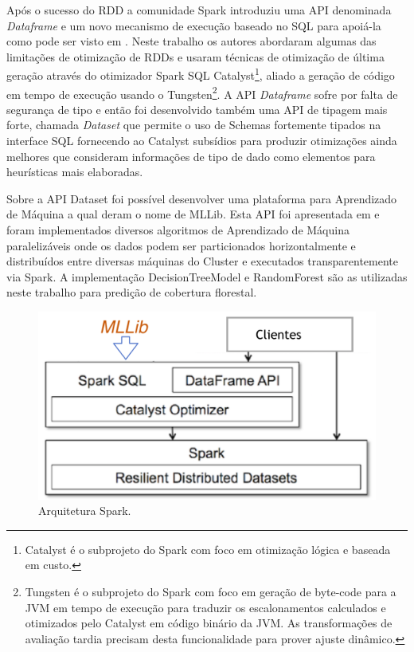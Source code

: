 \documentclass[12pt]{article}
\begin{document}
Após o sucesso do RDD a  comunidade Spark introduziu uma API denominada \emph{Dataframe} e um novo mecanismo de execução baseado no SQL para apoiá-la como pode ser visto em \cite{armbrust2015spark}. Neste trabalho os autores abordaram algumas das limitações de otimização de RDDs e usaram técnicas de otimização de última geração através do otimizador Spark SQL Catalyst\footnote{Catalyst é o subprojeto do Spark com foco em otimização lógica e baseada em custo.}, aliado a geração de código em tempo de execução usando o Tungsten\footnote{Tungsten é o subprojeto do Spark com foco em geração de byte-code para a JVM em tempo de execução para traduzir os escalonamentos calculados e otimizados pelo Catalyst em código binário da JVM. As transformações de avaliação tardia precisam desta funcionalidade para prover ajuste dinâmico.}. A API \emph{Dataframe} sofre por falta de segurança de tipo e então foi desenvolvido também uma API de tipagem mais forte, chamada \emph{Dataset} que permite o uso de Schemas fortemente tipados na interface SQL fornecendo ao Catalyst subsídios para produzir otimizações ainda melhores que consideram informações de tipo de dado como elementos para heurísticas mais elaboradas.   

Sobre a API  Dataset foi possível desenvolver uma plataforma para Aprendizado de Máquina a qual deram o nome de MLLib. Esta API foi apresentada em \cite{meng2016MLlib} e foram implementados diversos algoritmos de Aprendizado de Máquina paralelizáveis onde os dados podem ser particionados horizontalmente e distribuídos entre diversas máquinas do Cluster e executados transparentemente via Spark. A implementação DecisionTreeModel e RandomForest são as utilizadas neste trabalho para predição de cobertura florestal.


\begin{figure}[!ht]
	\centering
	\begin{minipage}[t]{0.55\textwidth}
        \includegraphics[width=\textwidth]{img/arq-spark.png}
        \centering
	\end{minipage}
	\caption
	{
	   Arquitetura Spark.
	}
	\label{fig:arqspark}
\end{figure}
\end{document}

